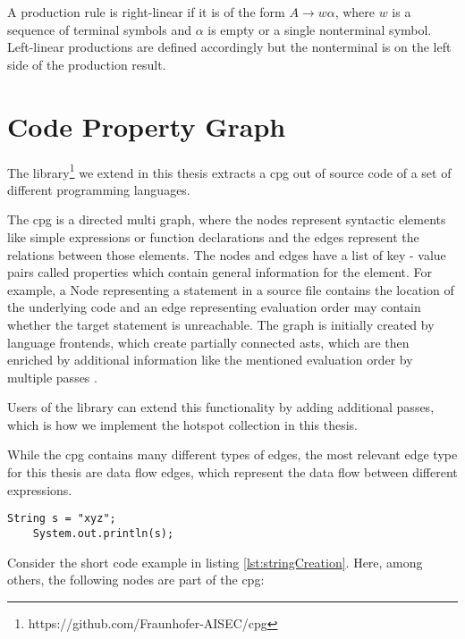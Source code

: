 A production rule is right-linear if it is of the form $A \rightarrow w \alpha$, where $w$ is a sequence of terminal symbols and $\alpha$ is empty or a single nonterminal symbol. Left-linear productions are defined accordingly but the nonterminal is on the left side of the production result.


\section{Code Property Graph}
The library\footnote{https://github.com/Fraunhofer-AISEC/cpg} we extend in this thesis extracts a \ac{cpg} out of source code of a set of different programming languages.

The \ac{cpg} is a directed multi graph, where the nodes represent syntactic elements like simple expressions or function declarations and the edges represent the relations between those elements. The nodes and edges have a list of key - value pairs called properties which contain general information for the element. For example, a Node representing a statement in a source file contains the location of the underlying code and an edge representing evaluation order may contain whether the target statement is unreachable. The graph is initially created by language frontends, which create partially connected \acp{ast}, which are then enriched by additional information like the mentioned evaluation order by multiple passes \cite{cpg}.

Users of the library can extend this functionality by adding additional passes, which is how we implement the hotspot collection in this thesis.


While the \ac{cpg} contains many different types of edges, the most relevant edge type for this thesis are data flow edges, which represent the data flow between different expressions.

\begin{lstlisting}[label={lst:stringCreation}, caption={Example code}, captionpos=b]
	String s = "xyz";
	System.out.println(s);
\end{lstlisting}

Consider the short code example in listing \ref{lst:stringCreation}. Here, among others, the following nodes are part of the \ac{cpg}:

